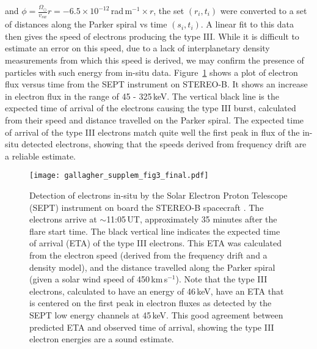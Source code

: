 and $\phi=\frac{ \Omega_{\odot}}{v_{sw}}r=-6.5\times10^{-12}$\,rad\,m$^{-1}\times r$, the set $(r_i,t_i)$ were converted to a set of distances along the Parker spiral vs time $(s_i, t_i)$. A linear fit to this data then gives the speed of electrons producing the type III. While it is difficult to estimate an error on this speed, due to a lack of interplanetary density measurements from which this speed is derived, we may confirm the presence of particles with such energy from in-situ data. Figure~\ref{fig:sept} shows a plot of electron flux versus time from the SEPT instrument on STEREO-B. It shows an increase in electron flux in the range of 45 - 325\,keV. The vertical black line is the expected time of arrival of the electrons causing the type III burst, calculated from their speed and distance travelled on the Parker spiral. The expected time of arrival of the type III electrons match quite well the first peak in flux of the in-situ detected electrons, showing that the speeds derived from frequency drift are a reliable estimate.
\begin{figure}[!t]
\begin{center}
\texttt{[image: gallagher\_supplem\_fig3\_final.pdf]}
\caption{Detection of electrons in-situ by the Solar Electron Proton Telescope (SEPT)\citep{muller2008} instrument on board the STEREO-B spacecraft \citep{kai08}. The electrons arrive at $\sim$11:05\,UT, approximately 35 minutes after the flare start time. The black vertical line indicates the expected time of arrival (ETA) of the type III electrons. This ETA was calculated from the electron speed (derived from the frequency drift and a density model), and the distance travelled along the Parker spiral (given a solar wind speed of 450\,km\,s$^{-1}$). Note that the type III electrons, calculated to have an energy of 46\,keV, have an ETA that is centered on the first peak in electron fluxes as detected by the SEPT low energy channels at 45\,keV. This good agreement between predicted ETA and observed time of arrival, showing the type III electron energies are a sound estimate.}
\label{fig:sept}
\end{center}
\end{figure}

